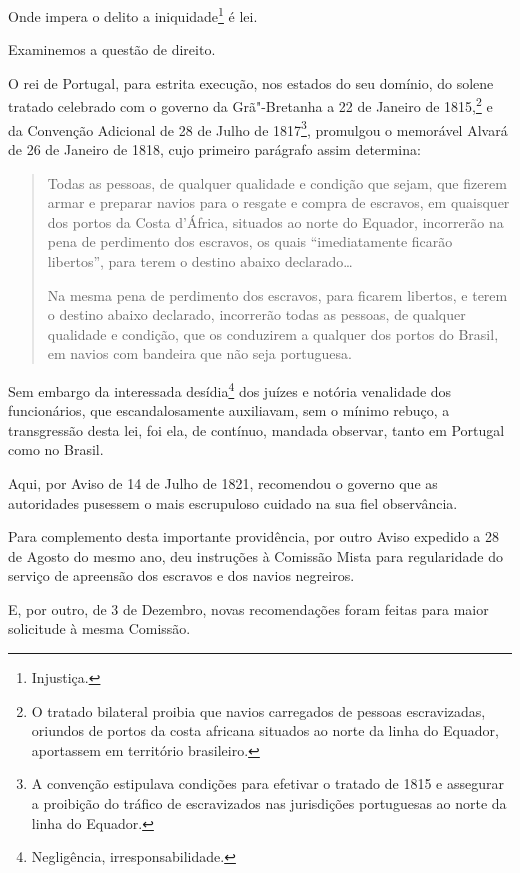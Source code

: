 Onde impera o delito a iniquidade\footnote{Injustiça.} é lei.

Examinemos a questão de direito.

O rei de Portugal, para estrita execução, nos estados do seu domínio, do
solene tratado celebrado com o governo da Grã"-Bretanha a 22 de Janeiro
de 1815,\footnote{O tratado bilateral proibia que navios carregados de
  pessoas escravizadas, oriundos de portos da costa africana situados ao
  norte da linha do Equador, aportassem em território brasileiro.} e da
Convenção Adicional de 28 de Julho de 1817\footnote{A convenção
  estipulava condições para efetivar o tratado de 1815 e assegurar a
  proibição do tráfico de escravizados nas jurisdições portuguesas ao
  norte da linha do Equador.}, promulgou o memorável Alvará de 26 de
Janeiro de 1818, cujo primeiro parágrafo assim determina:

\begin{quote}
Todas as pessoas, de qualquer qualidade e condição que sejam, que
fizerem armar e preparar navios para o resgate e compra de escravos, em
quaisquer dos portos da Costa d'África, situados ao norte do Equador,
incorrerão na pena de perdimento dos escravos, os quais ``imediatamente
ficarão libertos'', para terem o destino abaixo declarado\ldots{}

Na mesma pena de perdimento dos escravos, para ficarem libertos, e terem
o destino abaixo declarado, incorrerão todas as pessoas, de qualquer
qualidade e condição, que os conduzirem a qualquer dos portos do Brasil,
em navios com bandeira que não seja portuguesa.
\end{quote}

\asterisc

Sem embargo da interessada desídia\footnote{Negligência,
  irresponsabilidade.} dos juízes e notória venalidade dos funcionários,
que escandalosamente auxiliavam, sem o mínimo rebuço, a transgressão
desta lei, foi ela, de contínuo, mandada observar, tanto em Portugal
como no Brasil.

Aqui, por Aviso de 14 de Julho de 1821, recomendou o governo que as
autoridades pusessem o mais escrupuloso cuidado na sua fiel observância.

Para complemento desta importante providência, por outro Aviso expedido
a 28 de Agosto do mesmo ano, deu instruções à Comissão Mista para
regularidade do serviço de apreensão dos escravos e dos navios
negreiros.

E, por outro, de 3 de Dezembro, novas recomendações foram feitas para
maior solicitude à mesma Comissão.


